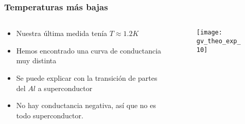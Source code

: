 \frame
{
  \frametitle{Temperaturas m\'as bajas}
    \begin{columns}
\begin{column}{0.6\textwidth}
     \begin{itemize}
      \item<1-> Nuestra \'ultima medida ten\'ia $T\approx 1.2K$
      \item<2-> Hemos encontrado una curva de conductancia muy distinta
      \item<3-> Se puede explicar con la transici\'on de partes del $Al$ a superconductor
      \item<4-> No hay conductancia negativa, as\'i que no es todo superconductor.
     \end{itemize}
     
       \end{column}
\begin{column}{0.4\textwidth}
	\begin{figure}[!h] \label{sample}
	\texttt{[image: gv\_theo\_exp\_10]}
	\end{figure}
\end{column}
\end{columns} 

 }

